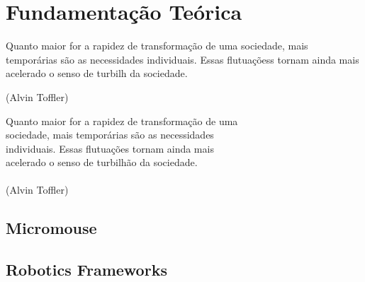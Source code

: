 \chapter{Fundamentação Teórica}
\label{chap:fundteor}

\begin{flushright}

   \begin{list}{}{
      \setlength{\leftmargin}{4.5cm}
      \setlength{\rightmargin}{0cm}
      \setlength{\labelwidth}{0pt}
      \setlength{\labelsep}{\leftmargin}}
      \item Quanto maior for a rapidez de transformação de uma
      sociedade, mais temporárias são as necessidades
      individuais. Essas flutuaçõess tornam ainda mais acelerado
      o senso de turbilh da sociedade.

      \begin{list}{}{
      \setlength{\leftmargin}{0cm}
      \setlength{\rightmargin}{0cm}
      \setlength{\labelwidth}{0pt}
      \setlength{\labelsep}{\leftmargin}}
      \item (Alvin Toffler)
      \end{list}
   \end{list}
\end{flushright}

\begin{flushright}
  Quanto maior for a rapidez de transformação de uma \\
  sociedade, mais temporárias são as necessidades \\
  individuais. Essas flutuações tornam ainda mais \\
  acelerado o senso de turbilhão da sociedade. \\
  \ \\
  (Alvin Toffler)
\end{flushright}

\section{Micromouse}
\label{sec:Micromouse}


\section{Robotics Frameworks}
\label{sec:robotic_frameworks}



